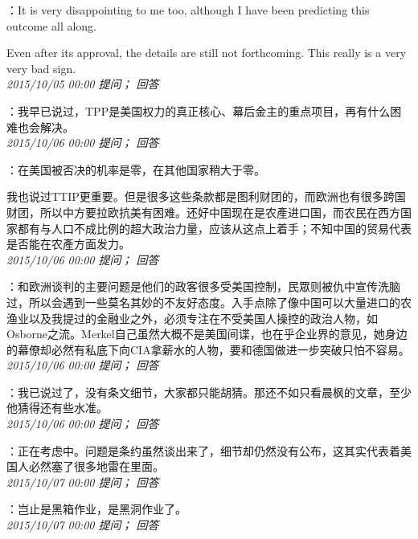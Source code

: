 \documentclass[twocolumn]{ctexart}
\begin{document}
：It is very disappointing to me too, although I have been predicting this outcome all along.

Even after its approval, the details are still not forthcoming. This really is a very very bad sign.\\

\textit{\hfill\noindent\small 2015/10/05 00:00 提问； 回答}

：我早已说过，TPP是美国权力的真正核心、幕后金主的重点项目，再有什么困难也会解决。\\

\textit{\hfill\noindent\small 2015/10/06 00:00 提问； 回答}

：在美国被否决的机率是零，在其他国家稍大于零。

我也说过TTIP更重要。但是很多这些条款都是图利财团的，而欧洲也有很多跨国财团，所以中方要拉欧抗美有困难。还好中国现在是农產进口国，而农民在西方国家都有与人口不成比例的超大政治力量，应该从这点上着手；不知中国的贸易代表是否能在农產方面发力。\\

\textit{\hfill\noindent\small 2015/10/06 00:00 提问； 回答}

：和欧洲谈判的主要问题是他们的政客很多受美国控制，民眾则被仇中宣传洗脑过，所以会遇到一些莫名其妙的不友好态度。入手点除了像中国可以大量进口的农渔业以及我提过的金融业之外，必须专注在不受美国人操控的政治人物，如Osborne之流。Merkel自己虽然大概不是美国间谍，也在乎企业界的意见，她身边的幕僚却必然有私底下向CIA拿薪水的人物，要和德国做进一步突破只怕不容易。\\

\textit{\hfill\noindent\small 2015/10/06 00:00 提问； 回答}

：我已说过了，没有条文细节，大家都只能胡猜。那还不如只看晨枫的文章，至少他猜得还有些水准。\\

\textit{\hfill\noindent\small 2015/10/06 00:00 提问； 回答}

：正在考虑中。问题是条约虽然谈出来了，细节却仍然没有公布，这其实代表着美国人必然塞了很多地雷在里面。\\

\textit{\hfill\noindent\small 2015/10/07 00:00 提问； 回答}

：岂止是黑箱作业，是黑洞作业了。\\

\textit{\hfill\noindent\small 2015/10/07 00:00 提问； 回答}
\end{document}
